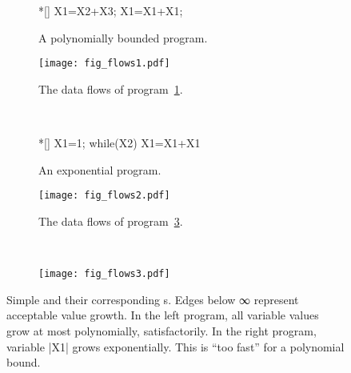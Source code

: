 \begin{figure}[H]
\centering
\begin{subfigure}{.45\textwidth}
\centering\begin{minipage}{.7\textwidth}
\begin{implisting}*[]
X1=X2+X3;
X1=X1+X1;
\end{implisting}
\end{minipage}
\caption{A polynomially bounded program.}\label{lst:simple-dfg-1}
\end{subfigure}\hfill
\begin{subfigure}{.45\textwidth}
\begin{center}
\texttt{[image: fig\_flows1.pdf]}
\end{center}
\caption{The data flows of program~\ref{lst:simple-dfg-1}.}\label{fig:simple-dfg-1}
\end{subfigure}\\[1em]
\begin{subfigure}{.45\textwidth}
\centering\begin{minipage}{.7\textwidth}
\begin{implisting}*[]
X1=1;
while(X2)
  X1=X1+X1
\end{implisting}
\end{minipage}
\caption{An exponential program.}\label{lst:simple-dfg-2}
\end{subfigure}\hfill
\begin{subfigure}{.45\textwidth}
\begin{center}
\texttt{[image: fig\_flows2.pdf]}
\end{center}
\caption{The data flows of program~\ref{lst:simple-dfg-2}.}\label{fig:simple-dfg-2}
\end{subfigure}\\[1em]
\begin{subfigure}{\textwidth}
\centering\texttt{[image: fig\_flows3.pdf]}
\end{subfigure}
\caption[Simple imperative programs and their corresponding data flow graphs]{
Simple  and their corresponding s.
Edges below ∞ represent acceptable value growth.
In the left program, all variable values grow at most polynomially, \ie satisfactorily.
In the right program, variable \pr|X1| grows exponentially.
This is \enquote{too fast} for a polynomial bound.}
\label{fig:dfg-ex}
\end{figure}

